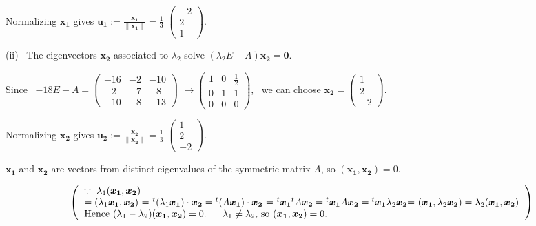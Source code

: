 \documentclass{jsarticle}
\begin{document}
Normalizing $\bm{x_1}$ gives 
$\bm{u_1} := \displaystyle \frac{\bm{x_1}}{\|\bm{x_1}\|} = \displaystyle \frac{1}{3}$
$\begin{pmatrix} -2 \\ 2 \\ 1 \end{pmatrix}$. 

\bigskip

(i\hspace{-0.5pt}i) \ The eigenvectors $\bm{x_2}$ associated to $\lambda_2$ solve
$(\lambda_2E-A) \bm{x_2} = \bm{0}$.

Since \ $-18E-A = \begin{pmatrix} -16&-2&-10 \\ -2&-7&-8 \\ -10&-8&-13 \end{pmatrix}$
$\longrightarrow \begin{pmatrix} 1&0&\frac{1}{2} \\ 0&1&1 \\ 0&0&0 \end{pmatrix}$, \ we can choose $\bm{x_2} = \begin{pmatrix} 1 \\ 2 \\ -2 \end{pmatrix}$.

Normalizing $\bm{x_2}$ gives
$\bm{u_2} := \displaystyle \frac{\bm{x_2}}{\|\bm{x_2}\|} = \displaystyle \frac{1}{3}$
$\begin{pmatrix} 1 \\ 2 \\ -2 \end{pmatrix}$. 


\bigskip

$\bm{x_1}$ and $\bm{x_2}$ are vectors from distinct eigenvalues of the symmetric matrix $A$, so
$(\bm{x_1}, \bm{x_2}) = 0$.

\[
  \left(
  \begin{tabular}{l}
  $\because \ \lambda_1 (\bm{x_1}, \bm{x_2})$ \\
  $ = (\lambda_1 \bm{x_1}, \bm{x_2})$ =
  ${}^t(\lambda_1 \bm{x_1}) \cdot \bm{x_2} = {}^t(A \bm{x_1}) \cdot \bm{x_2}$ =
  ${}^t \bm{x_1} {}^t A \bm{x_2} = {}^t \bm{x_1} A \bm{x_2} = {}^t \bm{x_1} \lambda_2 \bm{x_2}$=
  $(\bm{x_1}, \lambda_2 \bm{x_2}) = \lambda_2 (\bm{x_1}, \bm{x_2})$ \\
  Hence $(\lambda_1 - \lambda_2)(\bm{x_1}, \bm{x_2}) = 0. \ \ \ \ \ \lambda_1 \neq \lambda_2$,     so $(\bm{x_1}, \bm{x_2}) = 0$.
 \end{tabular}
  \right)
\]
\end{document}

